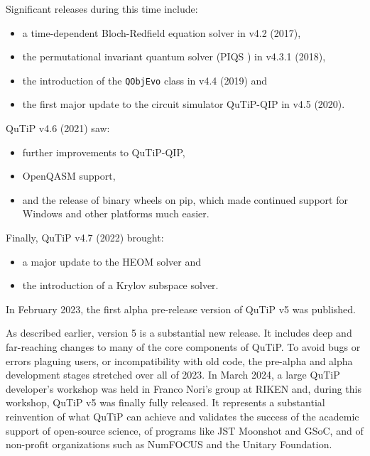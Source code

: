 \documentclass[preprint,3p,sort&compress]{elsarticle}
\def\code#1{\texttt{#1}}
\begin{document}
Significant releases during this time include: 
\begin{itemize}
  \item  a time-dependent Bloch-Redfield equation solver in v4.2 (2017), 
    \item  the permutational invariant quantum solver (PIQS \cite{Shammah_2018}) in v4.3.1 (2018), 
    \item the introduction of the \code{QObjEvo} class in v4.4 (2019) and
      \item   the first major update to the circuit simulator QuTiP-QIP in v4.5 (2020).   
          
\end{itemize}

QuTiP v4.6 (2021) saw:
\begin{itemize}
  \item further improvements to QuTiP-QIP, 
  \item OpenQASM support, 
  \item and the release of binary wheels on pip, which made continued support for Windows and other platforms much easier. 
\end{itemize}

  Finally, QuTiP v4.7 (2022) brought:
  \begin{itemize}
  \item a major update to the HEOM solver and 
  \item the introduction of a Krylov subspace solver.  
  \end{itemize}
  In February 2023, the first alpha pre-release version of QuTiP v5 was published. 

As described earlier, version 5 is a substantial new release. It includes deep and far-reaching changes to many of the core components of QuTiP. To avoid bugs or errors plaguing users, or incompatibility with old code, the pre-alpha and alpha development stages stretched over all of 2023.  In March 2024, a large QuTiP developer's workshop was held in Franco Nori's group at RIKEN and, during this workshop, QuTiP v5 was finally fully released. It represents a substantial reinvention of what QuTiP can achieve and validates the success of the academic support of open-source science, of programs like JST Moonshot and GSoC, and of non-profit organizations such as NumFOCUS and the Unitary Foundation.


\end{document}
